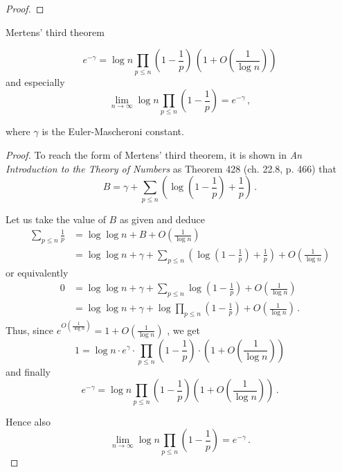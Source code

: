 \documentclass{article}
\begin{document}
\begin{theorem}
\begin{proof}
\end{proof}

\end{theorem}

\begin{theorem}
Mertens' third theorem
\label{thm:mertens3}

\begin{equation*}
    e^{-\gamma} = \log n \prod_{p\le n} \left(1-\frac{1}{p}\right)\,\left(1+O\left(\frac{1}{\log n}\right)\right)
\end{equation*}
and especially
\begin{equation*}
    \lim_{n \rightarrow \infty} \log n \prod_{p\leq n} \left(1-\frac{1}{p}\right) = e^{-\gamma}\,,
\end{equation*}

where $\gamma$ is the Euler-Mascheroni constant.

\begin{proof}
To reach the form of Mertens' third theorem, it is shown in \textit{An Introduction to the Theory of Numbers} \cite{HardyWright} as Theorem 428 (ch. 22.8, p. 466) that
\begin{equation*}
    B = \gamma + \sum_{p\leq n} \left(\log \left(1-\frac{1}{p}\right)+\frac{1}{p}\right)\,.
\end{equation*}

Let us take the value of $B$ as given and deduce
\begin{align*}
    \sum_{p\leq n} \frac{1}{p} & = \log\log n + B + O\left(\frac{1}{\log n}\right)\\
    & = \log\log n + \gamma + \sum_{p\leq n} \left(\log \left(1-\frac{1}{p}\right)+\frac{1}{p}\right) + O\left(\frac{1}{\log n}\right)
\end{align*}
or equivalently
\begin{align*}
    0 & = \log\log n + \gamma + \sum_{p\leq n} \log \left(1-\frac{1}{p}\right) + O\left(\frac{1}{\log n}\right)\\
    & = \log\log n + \gamma + \log \prod_{p\leq n} \left(1-\frac{1}{p}\right) + O\left(\frac{1}{\log n}\right)\,.
\end{align*}
Thus, since $e^{O\left(\frac{1}{\log n}\right)}=1+O\left(\frac{1}{\log n}\right)$ \cite[p. 9]{Rosen}, we get
\begin{equation*}
    1 = \log n \cdot e^\gamma \cdot \prod_{p\leq n} \left(1-\frac{1}{p}\right) \cdot \left(1+O\left(\frac{1}{\log n}\right)\right)
\end{equation*}
and finally
\begin{equation*}
    e^{-\gamma} = \log n \prod_{p\le n} \left(1-\frac{1}{p}\right) \left(1+O\left(\frac{1}{\log n}\right)\right)\,.
\end{equation*}

Hence also
\begin{equation*}
    \lim_{n \rightarrow \infty} \log n \prod_{p\leq n} \left(1-\frac{1}{p}\right) = e^{-\gamma}\,.
\end{equation*}
\end{proof}

\end{theorem}
\end{document}

